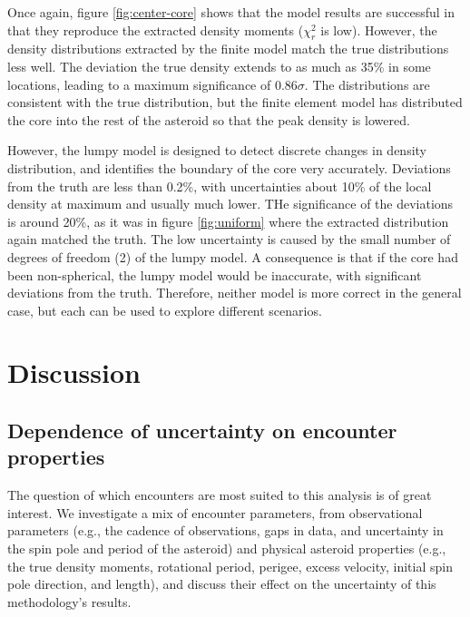 \documentclass[fleqn,usenatbib]{mnras}
\begin{document}
Once again, figure \ref{fig:center-core} shows that the model results are successful in that they reproduce the extracted density moments ($\chi^2_r$ is low). However, the density distributions extracted by the finite model match the true distributions less well. The deviation the true density extends to as much as 35\% in some locations, leading to a maximum significance of $0.86\sigma$. The distributions are consistent with the true distribution, but the finite element model has distributed the core into the rest of the asteroid so that the peak density is lowered.

However, the lumpy model is designed to detect discrete changes in density distribution, and identifies the boundary of the core very accurately. Deviations from the truth are less than 0.2\%, with uncertainties about 10\% of the local density at maximum and usually much lower. THe significance of the deviations is around 20\%, as it was in figure \ref{fig:uniform} where the extracted distribution again matched the truth. The low uncertainty is caused by the small number of degrees of freedom (2) of the lumpy model. A consequence is that if the core had been non-spherical, the lumpy model would be inaccurate, with significant deviations from the truth. Therefore, neither model is more correct in the general case, but each can be used to explore different scenarios.




\section{Discussion}
\label{sec:discussion}


\subsection{Dependence of uncertainty on encounter properties}
\label{sec:fit-uncertainty}


The question of which encounters are most suited to this analysis is of great interest. We investigate a mix of encounter parameters, from observational parameters (e.g., the cadence of observations, gaps in data, and uncertainty in the spin pole and period of the asteroid) and physical asteroid properties (e.g., the true density moments, rotational period, perigee, excess velocity, initial spin pole direction, and length), and discuss their effect on the uncertainty of this methodology's results.
\end{document}
